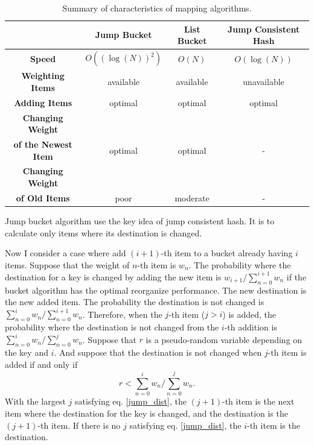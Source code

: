 \documentclass[a4paper,11pt]{article}
\begin{document}
\begin{table}[tbp]
\begin{tabular}{|c|c|c|c|} \hline
& {\bf Jump Bucket} & {\bf List Bucket} & {\bf Jump Consistent Hash} \\\hline
{\bf Speed}           & $O((\log(N))^2)$ & $O(N)$      & $O(\log(N))$     \\\hline
{\bf Weighting Items} & available        & available   & unavailable     \\\hline
{\bf Adding Items}    & optimal          & optimal     & optimal          \\\hline
{\bf Changing Weight} &&& \\
{\bf of the Newest Item}& optimal & optimal & - \\\hline
{\bf Changing Weight} &&& \\
{\bf of Old Items}& poor & moderate & - \\\hline
\end{tabular}
\caption{Summary of characteristics of mapping algorithms.}
\label{table_algorithms}
\end{table}

Jump bucket algorithm use the key idea of jump consistent hash.
It is to calculate only items where its destination is changed.

Now I consider a case where add $(i+1)$-th item to a bucket already having $i$ items.
Suppose that the weight of $n$-th item is $w_n$.
The probability where the destination for a key is changed by adding the new item is
$w_{i+1} / \sum_{n=0}^{i+1} w_n$ if the bucket algorithm has the optimal reorganize performance.
The new destination is the new added item.
The probability the destination is not changed is $\sum_{n=0}^i w_n / \sum_{n=0}^{i+1} w_n$.
Therefore, when the $j$-th item ($j > i$) is added, the probability where the destination is not changed from the $i$-th addition is $\sum_{n=0}^i w_n / \sum_{n=0}^j w_n$.
Suppose that $r$ is a pseudo-random variable depending on the key and $i$.
And suppose that the destination is not changed when $j$-th item is added if and only if
\begin{equation}
r < \sum_{n=0}^i w_n \bigg/ \sum_{n=0}^j w_n. \label{jump_dist}
\end{equation}
With the largest $j$ satisfying eq. \eqref{jump_dist}, the $(j+1)$-th item is the next item where the destination for the key is changed, and the destination is the $(j+1)$-th item.
If there is no $j$ satisfying eq. \eqref{jump_dist}, the $i$-th item is the destination.
\end{document}
